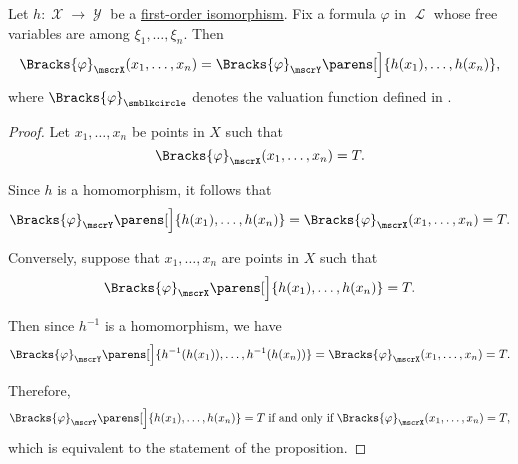 \begin{proposition}\label{thm:automorphism_preserves_validity}
  Let \( h: \mscrX \to \mscrY \) be a \hyperref[def:first_order_isomorphism]{first-order isomorphism}. Fix a formula \( \varphi \) in \( \mscrL \) whose free variables are among \( \xi_1, \ldots, \xi_n \). Then
  \begin{equation*}
    \Bracks{\varphi}_\mscrX(x_1, \ldots, x_n) = \Bracks{\varphi}_\mscrY\parens[\Big]{ h(x_1), \ldots, h(x_n) },
  \end{equation*}
  where \( \Bracks{\varphi}_{\anon} \) denotes the valuation function defined in .
\end{proposition}
\begin{proof}
  Let \( x_1, \ldots, x_n \) be points in \( X \) such that
  \begin{equation*}
    \Bracks{\varphi}_\mscrX(x_1, \ldots, x_n) = T.
  \end{equation*}

  Since \( h \) is a homomorphism, it follows that
  \begin{equation*}
    \Bracks{\varphi}_\mscrY\parens[\Big]{h(x_1), \ldots, h(x_n)} = \Bracks{\varphi}_\mscrX(x_1, \ldots, x_n) = T.
  \end{equation*}

  Conversely, suppose that \( x_1, \ldots, x_n \) are points in \( X \) such that
  \begin{equation*}
    \Bracks{\varphi}_\mscrX\parens[\Big]{h(x_1), \ldots, h(x_n)} = T.
  \end{equation*}

  Then since \( h^{-1} \) is a homomorphism, we have
  \begin{equation*}
    \Bracks{\varphi}_\mscrY\parens[\Big]{h^{-1}(h(x_1)), \ldots, h^{-1}(h(x_n))}
    =
    \Bracks{\varphi}_\mscrX(x_1, \ldots, x_n)
    =
    T.
  \end{equation*}

  Therefore,
  \begin{equation*}
    \Bracks{\varphi}_\mscrY\parens[\Big]{ h(x_1), \ldots, h(x_n) } = T \T{if and only if} \Bracks{\varphi}_\mscrX(x_1, \ldots, x_n) = T,
  \end{equation*}
  which is equivalent to the statement of the proposition.
\end{proof}

